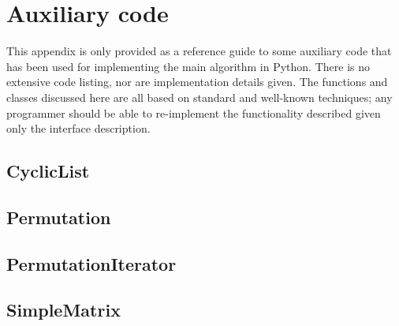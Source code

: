
\chapter{Auxiliary code}
\label{chap:aux}

This appendix is only provided as a reference guide to some auxiliary
code that has been used for implementing the main algorithm in Python.
There is no extensive code listing, nor are implementation details
given.  The functions and classes discussed here are all based on
standard and well-known techniques; any programmer should be able to
re-implement the functionality described given only the interface
description.

\section{CyclicList}
\label{sec:CyclicList}

\section{Permutation}
\label{sec:Permutation}

\section{PermutationIterator}
\label{sec:PermutationIterator}

\section{SimpleMatrix}
\label{sec:SimpleMatrix}





